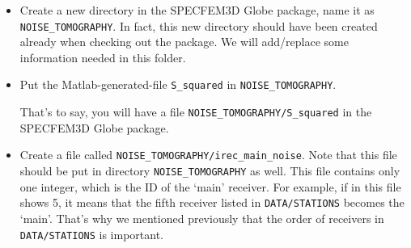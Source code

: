 \begin{itemize}
In Matlab, simply run:
\begin{verbatim}
NOISE_TOMOGRAPHY(NSTEP, dt, Tmin, Tmax, NOISE_MODEL)
\end{verbatim}

\texttt{NSTEP} and \texttt{dt} have been given when compiling the SPECFEM3D Globe source code;
\texttt{Tmin} and \texttt{Tmax} correspond to the period range you are interested in;
\texttt{NOISE\_MODEL} denotes the noise model you will be using.
Details can be found in the Matlab script.

After running the Matlab script, you will be given the following information (plus a figure in Matlab):
\begin{verbatim}
*************************************************************
the source time function has been saved in:
/data2/yangl/3D_NOISE/S_squared         (note this path must be different)
S_squared should be put into directory:
./NOISE_TOMOGRAPHY/ in the SPECFEM3D Globe package
\end{verbatim}

In other words, the Matlab script creates a file called \texttt{S\_squared},
which is the first `new' input file we encounter for noise simulations.

One may choose a flat noise spectrum rather than Peterson's noise model.
This can be done easily by modifying the Matlab script a little bit.

\item
Create a new directory in the SPECFEM3D Globe package, name it as \texttt{NOISE\_TOMOGRAPHY}.
In fact, this new directory should have been created already when checking out the package.
We will add/replace some information needed in this folder.

\item
Put the Matlab-generated-file \texttt{S\_squared} in \texttt{NOISE\_TOMOGRAPHY}.

That's to say, you will have a file \texttt{NOISE\_TOMOGRAPHY/S\_squared} in the SPECFEM3D Globe package.

\item
Create a file called \texttt{NOISE\_TOMOGRAPHY/irec\_main\_noise}. Note that this file should be put
in directory \texttt{NOISE\_TOMOGRAPHY} as well. This file contains only one integer, which is the ID
of the `main' receiver. For example, if in this file shows 5, it means that the fifth receiver
listed in \texttt{DATA/STATIONS} becomes the `main'. That's why we mentioned previously that
the order of receivers in \texttt{DATA/STATIONS} is important.


\end{itemize}
